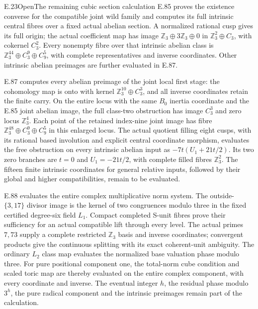 \begin{statement}{E.23}{Open}{The remaining cubic section calculation}
E.85 proves the existence converse for the compatible joint wild
family and computes its full intrinsic central fibres over a fixed
actual abelian section. A normalized rational cusp gives its full
origin; the actual coefficient map has image
$\mathbb Z_3\oplus3\mathbb Z_3\oplus0$ in
$\mathbb Z_3^2\oplus C_3$, with cokernel $C_3^2$.
Every nonempty fibre over that intrinsic abelian class is
$\mathbb Z_3^{44}\oplus C_3^9\oplus C_9^5$, with complete
representatives and inverse coordinates. Other intrinsic abelian
preimages are further evaluated in E.87.

E.87 computes every abelian preimage of the joint local first stage:
the cohomology map is onto with kernel
\(\mathbb Z_3^{10}\oplus C_3^3\), and all inverse coordinates
retain the finite carry. On the entire locus with the same
\(B_0\) inertia coordinate and the E.85 joint abelian image,
the full class-two obstruction has image \(C_3^3\) and zero locus
\(\mathbb Z_3^4\). Each point of the retained index-nine joint
image has fibre \(\mathbb Z_3^{48}\oplus C_3^9\oplus C_9^5\)
in this enlarged locus. The actual quotient filling eight cusps,
with its rational based involution and explicit central coordinate
morphism, evaluates the free obstruction on every intrinsic
abelian input as \(-7t(U_1+21t/2)\). Its two zero branches are
\(t=0\) and \(U_1=-21t/2\), with complete filled fibres
\(\mathbb Z_3^2\). The fifteen finite intrinsic coordinates for
general relative inputs, followed by their global and higher
compatibilities, remain to be evaluated.


E.88 evaluates the entire complex multiplicative norm system.
The outside-\(\{3,17\}\) divisor image is the kernel of two
congruences modulo three in the fixed certified degree-six field
\(L_1\). Compact completed S-unit fibres prove their sufficiency
for an actual compatible lift through every level. The actual
primes \(7,73\) supply a complete restricted \(\mathbb Z_3\)
basis and inverse coordinates; convergent products give the
continuous splitting with its exact coherent-unit ambiguity.
The ordinary \(L_2\) class map evaluates the normalized base
valuation phase modulo three. For pure positional component one,
the total-norm cube condition and scaled toric map are thereby
evaluated on the entire complex component, with every coordinate
and inverse. The eventual integer \(h\), the residual phase modulo
\(3^h\), the pure radical component and the intrinsic preimages
remain part of the calculation.


\end{statement}
